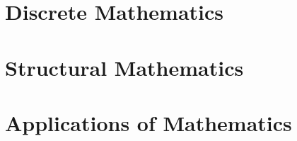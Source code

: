 \part{Discrete Mathematics} 




\part{Structural Mathematics}   %
 




 
 
 
 











\part{Applications of Mathematics}


